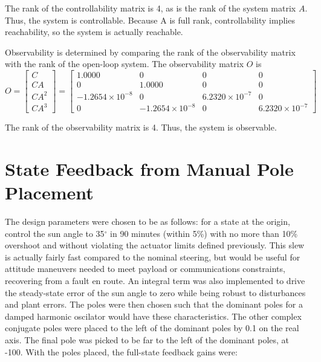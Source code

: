 \documentclass[]{aiaa-tc}%
\begin{document}
The rank of the controllability matrix is 4, as is the rank of the system matrix $A$. Thus, the system is controllable. Because A is full rank, controllability implies reachability, so the system is actually reachable.

	\vspace{5 mm}

	Observability is determined by comparing the rank of the observability matrix with the rank of the open-loop system. The observability matrix $O$ is
	\begin{equation}
O=\begin{bmatrix}
C\\ 
CA\\ 
CA^2\\ 
CA^3
\end{bmatrix}=\begin{bmatrix}
    1.0000 &             0 &            0 &           0\\ 
             0 &    1.0000 &            0 &           0\\ 
   -1.2654\times10^{-8} &             0 &   6.2320\times10^{-7} &           0\\ 
             0 &   -1.2654\times10^{-8} &            0 &  6.2320\times10^{-7}
\end{bmatrix}
	\end{equation}

The rank of the observability matrix is 4. Thus, the system is observable.

	\section{State Feedback from Manual Pole Placement}
	The design parameters were chosen to be as follows: for a state at the origin, control the sun angle to 35$^{\circ}$ in 90 minutes (within 5\%) with no more than 10\% overshoot and without violating the actuator limits defined previously. This slew is actually fairly fast compared to the nominal steering, but would be useful for attitude maneuvers needed to meet payload or communications constraints, recovering from a fault en route. An integral term was also implemented to drive the steady-state error of the sun angle to zero while being robust to disturbances and plant errors. The poles were then chosen such that the dominant poles for a damped harmonic oscilator would have these characteristics. The other complex conjugate poles were placed to the left of the dominant poles by 0.1 on the real axis. The final pole was picked to be far to the left of the dominant poles, at -100. With the poles placed, the full-state feedback gains were:
\end{document}
